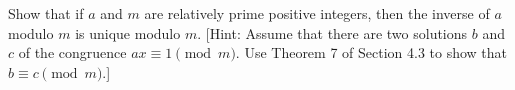 
%
%
%

	Show that if $a$ and $m$ are relatively prime positive integers,
	then the inverse of $a$ modulo $m$ is unique modulo $m$.
	[Hint: Assume that there are two solutions $b$ and $c$ of the congruence $ax \equiv 1 \pmod{m}$.
	Use Theorem 7 of Section 4.3 to show that $b \equiv c \pmod{m}$.]

\solution
